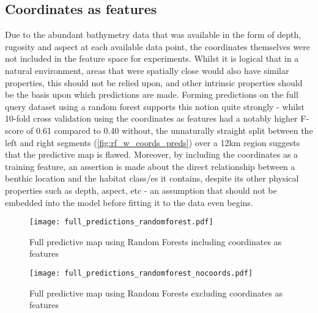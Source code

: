\subsection{Coordinates as features}
Due to the abundant bathymetry data that was available in the form of depth, rugosity and aspect at each available data point, the coordinates themselves were not included in the feature space for experiments. Whilst it is logical that in a natural environment, areas that were spatially close would also have similar properties, this should not be relied upon, and other intrinsic properties should be the basis upon which predictions are made. Forming predictions on the full query dataset using a random forest supports this notion quite strongly - whilst 10-fold cross validation using the coordinates as features had a notably higher F-score of 0.61 compared to 0.40 without, the unnaturally straight split between the left and right segments (\autoref{fig:rf_w_coords_preds}) over a 12km region suggests that the predictive map is flawed. Moreover, by including the coordinates as a training feature, an assertion is made about the direct relationship between a benthic location and the habitat class/es it contains, despite its other physical properties such as depth, aspect, etc - an assumption that should not be embedded into the model before fitting it to the data even begins.

\begin{figure}[H]
    \begin{minipage}{.49\linewidth}
        \texttt{[image: full\_predictions\_randomforest.pdf]}
        \caption{Full predictive map using Random Forests including coordinates as features}
        \label{fig:rf_w_coords_preds}
    \end{minipage}
    \hfill
    \begin{minipage}{.49\linewidth}
        \texttt{[image: full\_predictions\_randomforest\_nocoords.pdf]}
        \caption{Full predictive map using Random Forests excluding coordinates as features}
        \label{fig:rf_wo_coords_preds}
    \end{minipage}
\end{figure}

